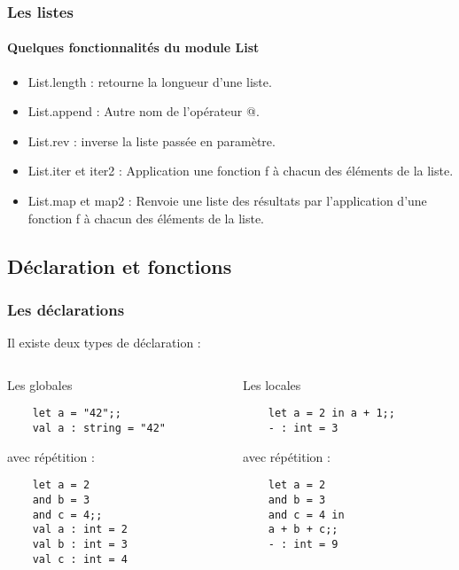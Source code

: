 \begin{frame}[fragile]
	\frametitle{Les listes}
	\framesubtitle{Quelques fonctionnalités du module List}
	\begin{itemize}
	
	\item List.length : retourne la longueur d'une liste.	
	
	\item List.append : Autre nom de l'opérateur @.
	
	\item List.rev : inverse la liste passée en paramètre.
	
	\item List.iter et iter2 : Application une fonction f à chacun des éléments de la liste.

	\item List.map et map2 : Renvoie une liste des résultats par l'application d'une fonction f à chacun des éléments de la liste.

	\end{itemize}
\end{frame}


\subsection{Déclaration et fonctions} %
\begin{frame}[fragile]
      \frametitle{Les déclarations}
      Il existe deux types de déclaration :
	\begin{columns}[t]
		\begin{column}{5cm}
		\begin{block}{Les globales}
		\begin{lstlisting}
	let a = "42";;
	val a : string = "42"
	\end{lstlisting}
	avec répétition :
	\begin{lstlisting}
	let a = 2
	and b = 3
	and c = 4;;
	val a : int = 2
	val b : int = 3
	val c : int = 4
		\end{lstlisting}
		\end{block}
		\end{column}
      		\begin{column}{5cm}
		\begin{block}{Les locales}
		\begin{lstlisting}
	let a = 2 in a + 1;;
	- : int = 3
	\end{lstlisting}
	avec répétition :
	\begin{lstlisting}
	let a = 2
	and b = 3
	and c = 4 in
	a + b + c;;
	- : int = 9
		\end{lstlisting}
		\end{block}
      		\end{column}
	\end{columns}
\end{frame}

